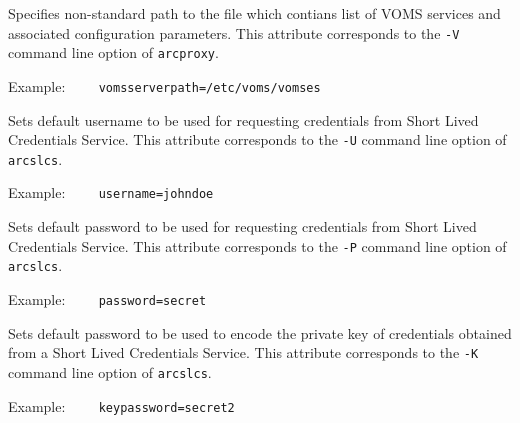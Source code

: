 {}
\hspace*{0.5cm}
\begin{shaded}
\end{shaded}

Specifies non-standard path to the file which contians list of VOMS services and
associated configuration parameters. This attribute
corresponds to the \verb#-V# command line option of \texttt{arcproxy}.

Example:
\verb#    vomsserverpath=/etc/voms/vomses#

{}
\hspace*{0.5cm}
\begin{shaded}
\end{shaded}

Sets default username to be used for requesting credentials from Short Lived
Credentials Service. This attribute
corresponds to the \verb#-U# command line option of \texttt{arcslcs}.

Example:
\verb#    username=johndoe#

{}
\hspace*{0.5cm}
\begin{shaded}
\end{shaded}

Sets default password to be used for requesting credentials from Short Lived
Credentials Service. This attribute
corresponds to the \verb#-P# command line option of \texttt{arcslcs}.

Example:
\verb#    password=secret#

{}
\hspace*{0.5cm}
\begin{shaded}
\end{shaded}

Sets default password to be used to encode the private key of credentials obtained
from a Short Lived Credentials Service. This attribute
corresponds to the \verb#-K# command line option of \texttt{arcslcs}.

Example:
\verb#    keypassword=secret2#

{}
\hspace*{0.5cm}
\begin{shaded}
\end{shaded}

